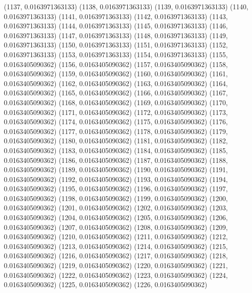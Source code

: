 {					(1137, 0.0163971363133)
					(1138, 0.0163971363133)
					(1139, 0.0163971363133)
					(1140, 0.0163971363133)
					(1141, 0.0163971363133)
					(1142, 0.0163971363133)
					(1143, 0.0163971363133)
					(1144, 0.0163971363133)
					(1145, 0.0163971363133)
					(1146, 0.0163971363133)
					(1147, 0.0163971363133)
					(1148, 0.0163971363133)
					(1149, 0.0163971363133)
					(1150, 0.0163971363133)
					(1151, 0.0163971363133)
					(1152, 0.0163971363133)
					(1153, 0.0163971363133)
					(1154, 0.0163971363133)
					(1155, 0.0163405090362)
					(1156, 0.0163405090362)
					(1157, 0.0163405090362)
					(1158, 0.0163405090362)
					(1159, 0.0163405090362)
					(1160, 0.0163405090362)
					(1161, 0.0163405090362)
					(1162, 0.0163405090362)
					(1163, 0.0163405090362)
					(1164, 0.0163405090362)
					(1165, 0.0163405090362)
					(1166, 0.0163405090362)
					(1167, 0.0163405090362)
					(1168, 0.0163405090362)
					(1169, 0.0163405090362)
					(1170, 0.0163405090362)
					(1171, 0.0163405090362)
					(1172, 0.0163405090362)
					(1173, 0.0163405090362)
					(1174, 0.0163405090362)
					(1175, 0.0163405090362)
					(1176, 0.0163405090362)
					(1177, 0.0163405090362)
					(1178, 0.0163405090362)
					(1179, 0.0163405090362)
					(1180, 0.0163405090362)
					(1181, 0.0163405090362)
					(1182, 0.0163405090362)
					(1183, 0.0163405090362)
					(1184, 0.0163405090362)
					(1185, 0.0163405090362)
					(1186, 0.0163405090362)
					(1187, 0.0163405090362)
					(1188, 0.0163405090362)
					(1189, 0.0163405090362)
					(1190, 0.0163405090362)
					(1191, 0.0163405090362)
					(1192, 0.0163405090362)
					(1193, 0.0163405090362)
					(1194, 0.0163405090362)
					(1195, 0.0163405090362)
					(1196, 0.0163405090362)
					(1197, 0.0163405090362)
					(1198, 0.0163405090362)
					(1199, 0.0163405090362)
					(1200, 0.0163405090362)
					(1201, 0.0163405090362)
					(1202, 0.0163405090362)
					(1203, 0.0163405090362)
					(1204, 0.0163405090362)
					(1205, 0.0163405090362)
					(1206, 0.0163405090362)
					(1207, 0.0163405090362)
					(1208, 0.0163405090362)
					(1209, 0.0163405090362)
					(1210, 0.0163405090362)
					(1211, 0.0163405090362)
					(1212, 0.0163405090362)
					(1213, 0.0163405090362)
					(1214, 0.0163405090362)
					(1215, 0.0163405090362)
					(1216, 0.0163405090362)
					(1217, 0.0163405090362)
					(1218, 0.0163405090362)
					(1219, 0.0163405090362)
					(1220, 0.0163405090362)
					(1221, 0.0163405090362)
					(1222, 0.0163405090362)
					(1223, 0.0163405090362)
					(1224, 0.0163405090362)
					(1225, 0.0163405090362)
					(1226, 0.0163405090362)
}
